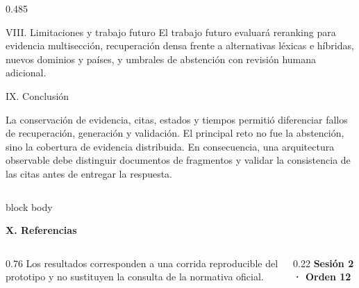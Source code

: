 \documentclass[final]{beamer}
\begin{document}
\begin{frame}[t]
\begin{columns}[T,totalwidth=\textwidth]
\begin{column}{0.485\textwidth}
\begin{block}{VIII. Limitaciones y trabajo futuro}
\vspace{0.35cm}
El trabajo futuro evaluará reranking para evidencia multisección, recuperación
densa frente a alternativas léxicas e híbridas, nuevos dominios y países, y
umbrales de abstención con revisión humana adicional.
\end{block}

\begin{block}{IX. Conclusión}

\vspace{0.35cm}
La conservación de evidencia, citas, estados y tiempos permitió diferenciar
fallos de recuperación, generación y validación. El principal reto no fue la
abstención, sino la cobertura de evidencia distribuida. En consecuencia, una
arquitectura observable debe distinguir documentos de fragmentos y validar la
consistencia de las citas antes de entregar la respuesta.
\end{block}

\end{column}
\end{columns}

\vspace{0.45cm}

\begin{beamercolorbox}[wd=\textwidth,sep=0cm]{block body}
  {\color{Navy}\bfseries\fontsize{26}{30}\selectfont X. Referencias\par}
  \vspace{0.25cm}
  {\fontsize{18}{22}\selectfont
    
    
  }
\end{beamercolorbox}

\vspace{0.10cm}
\begin{columns}[T,totalwidth=\textwidth]
  \begin{column}{0.76\textwidth}
    {\color{BodyText}\fontsize{18}{22}\selectfont
      Los resultados corresponden a una corrida reproducible del prototipo y
      no sustituyen la consulta de la normativa oficial.}
  \end{column}
  \begin{column}{0.22\textwidth}
    \raggedleft
    {\color{Navy}\bfseries\fontsize{18}{21}\selectfont Sesión 2 · Orden 12}
  \end{column}
\end{columns}

\end{frame}
\end{document}
